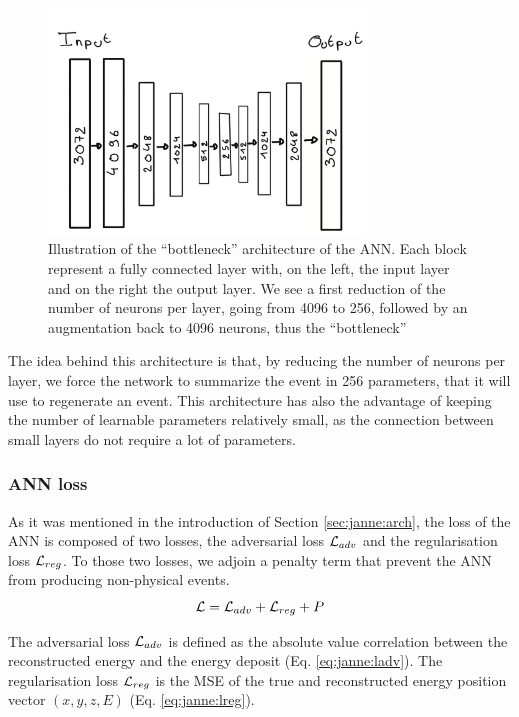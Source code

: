 \documentclass[../main.tex]{subfiles}
\begin{document}
\begin{figure}
  \centering
  \includegraphics[height=6cm]{images/janne/ANN_illustration.png}
  \caption{Illustration of the ``bottleneck'' architecture of the ANN. Each block represent a fully connected layer with, on the left, the input layer and on the right the output layer. We see a first reduction of the number of neurons per layer, going from 4096 to 256, followed by an augmentation back to 4096 neurons, thus the ``bottleneck''}
  \label{fig:janne:ann_arch}
\end{figure}

The idea behind this architecture is that, by reducing the number of neurons per layer, we force the network to summarize the event in 256 parameters, that it will use to regenerate an event. This architecture has also the advantage of keeping the number of learnable parameters relatively small, as the connection between small layers do not require a lot of parameters.

\subsubsection{ANN loss}

As it was mentioned in the introduction of Section \ref{sec:janne:arch}, the loss of the ANN is composed of two losses, the adversarial loss ${\cal L}_{adv}$ and the regularisation loss ${\cal L}_{reg}$. To those two losses, we adjoin a penalty term that prevent the ANN from producing non-physical events.
\begin{equation*}
  {\cal L} = {\cal L}_{adv} + {\cal L}_{reg} + P
\end{equation*}

The adversarial loss ${\cal L}_{adv}$ is defined as the absolute value correlation between the reconstructed energy and the energy deposit (Eq. \ref{eq:janne:ladv}). The regularisation loss ${\cal L}_{reg}$ is the MSE of the true and reconstructed energy position vector $(x, y, z, E)$ (Eq. \ref{eq:janne:lreg}).
\end{document}
